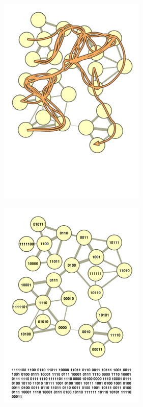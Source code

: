 \begin{figure}
  \begin{subfigure}{.5\textwidth}
    \centering
    \includegraphics[width=7cm]{infomap1.png}
    \caption{}
    \label{fig:infomap_a}
  \end{subfigure}
  \begin{subfigure}{.5\textwidth}
    \centering
    \includegraphics[width=7cm]{infomap2.png}
    \caption{}
    \label{fig:infomap_b}
  \end{subfigure}
  \begin{subfigure}{.5\textwidth}
    \centering

\end{subfigure}
\end{figure}
